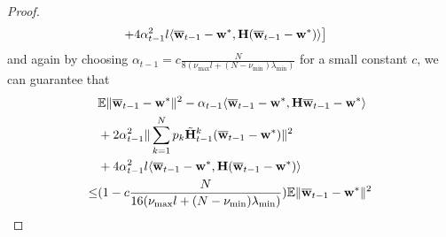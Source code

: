 \begin{proof}
\begin{align*}
	& \left.+4\alpha_{t-1}^{2}l\langle{\overline{\mathbf{w}}}_{t-1}-{\mathbf{w}}^{\ast},{\mathbf{H}}({\overline{\mathbf{w}}}_{t-1}-{\mathbf{w}}^{\ast})\rangle\right]
	\end{align*}
	and again by choosing $\alpha_{t-1}=c\frac{N}{8(\nu_{\max}l+(N-\nu_{\min})\lambda_{\min})}$
	for a small constant $c$, we can guarantee that 
	\begin{align*}
	&\mathbb{E}\|{\overline{\mathbf{w}}}_{t-1}-{\mathbf{w}}^{\ast}\|^{2}-\alpha_{t-1}\langle{\overline{\mathbf{w}}}_{t-1}-{\mathbf{w}}^{\ast},{\mathbf{H}}{\overline{\mathbf{w}}}_{t-1}-{\mathbf{w}}^{\ast}\rangle\\
	&+2\alpha_{t-1}^{2}\|\sum_{k=1}^{N}p_{k}\tilde{{\mathbf{H}}}_{t-1}^{k}({\overline{\mathbf{w}}}_{t-1}-{\mathbf{w}}^{\ast})\|^{2}\\
	&+4\alpha_{t-1}^{2}l\langle{\overline{\mathbf{w}}}_{t-1}-{\mathbf{w}}^{\ast},{\mathbf{H}}({\overline{\mathbf{w}}}_{t-1}-{\mathbf{w}}^{\ast})\rangle\\
	\leq&(1-c\frac{N}{16(\nu_{\max}l+(N-\nu_{\min})\lambda_{\min})})\mathbb{E}\|{\overline{\mathbf{w}}}_{t-1}-{\mathbf{w}}^{\ast}\|^{2}
	\end{align*}
	

\end{proof}
